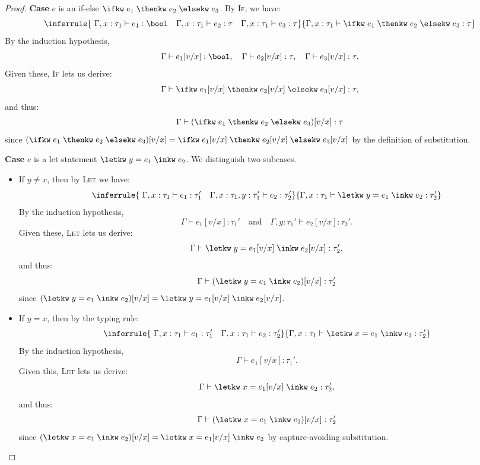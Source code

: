 \begin{proof}
	\textbf{Case} $e$ is an if-else $\ifkw \; e_1 \; \thenkw \; e_2 \; \elsekw \; e_3$. By \textsc{If}, we have:
	\[
		\inferrule
		{\ \Gamma, x : \tau_1 \vdash e_1 : \bool \quad \Gamma, x : \tau_1 \vdash e_2 : \tau \quad \Gamma, x : \tau_1 \vdash e_3 : \tau}
		{\Gamma, x : \tau_1 \vdash \ifkw \; e_1 \; \thenkw \; e_2 \; \elsekw \; e_3 : \tau}
	\]
	By the induction hypothesis,
	\[
		\Gamma \vdash e_1[v/x] : \bool,
		\quad
		\Gamma \vdash e_2[v/x] : \tau,
		\quad
		\Gamma \vdash e_3[v/x] : \tau.
	\]
	Given these, \textsc{If} lets us derive:
	\[
		\Gamma \vdash \ifkw \; e_1[v/x] \; \thenkw \; e_2[v/x] \; \elsekw \; e_3[v/x] : \tau,
	\]
	and thus:
	\[
		\Gamma \vdash (\ifkw \; e_1 \; \thenkw \; e_2 \; \elsekw \; e_3)[v/x] : \tau
	\]
	since $(\ifkw \; e_1 \; \thenkw \; e_2 \; \elsekw \; e_3)[v/x] = \ifkw \; e_1[v/x] \; \thenkw \; e_2[v/x] \; \elsekw \; e_3[v/x]$ by the definition of substitution.

	\textbf{Case} $e$ is a let statement $\letkw \; y = e_1 \; \inkw \; e_2$. We distinguish two subcases.

	\begin{itemize}
		\item If $y \neq x$, then by \textsc{Let} we have:
		\[
			\inferrule
			{\ \Gamma, x : \tau_1 \vdash e_1 : \tau_1' \quad \Gamma, x : \tau_1, y : \tau_1' \vdash e_2 : \tau_2'}
			{\Gamma, x : \tau_1 \vdash \letkw \; y = e_1 \; \inkw \; e_2 : \tau_2'}
		\]
		By the induction hypothesis,
		\[
			\Gamma \vdash e_1[v/x] : \tau_1'
			\quad\text{and}\quad
			\Gamma, y : \tau_1' \vdash e_2[v/x] : \tau_2'.
		\]
		Given these, \textsc{Let} lets us derive:
		\[
			\Gamma \vdash \letkw \; y = e_1[v/x] \; \inkw \; e_2[v/x] : \tau_2',
		\]
		and thus:
		\[
			\Gamma \vdash (\letkw \; y = e_1 \; \inkw \; e_2)[v/x] : \tau_2'
		\]
		since $(\letkw \; y = e_1 \; \inkw \; e_2)[v/x] = \letkw \; y = e_1[v/x] \; \inkw \; e_2[v/x]$.

		\item If $y = x$, then by the typing rule:
		\[
			\inferrule
			{\ \Gamma, x : \tau_1 \vdash e_1 : \tau_1' \quad \Gamma, x : \tau_1 \vdash e_2 : \tau_2'}
			{\Gamma, x : \tau_1 \vdash \letkw \; x = e_1 \; \inkw \; e_2 : \tau_2'}
		\]
		By the induction hypothesis,
		\[
			\Gamma \vdash e_1[v/x] : \tau_1'.
		\]
		Given this, \textsc{Let} lets us derive:
		\[
			\Gamma \vdash \letkw \; x = e_1[v/x] \; \inkw \; e_2 : \tau_2',
		\]
		and thus:
		\[
			\Gamma \vdash (\letkw \; x = e_1 \; \inkw \; e_2)[v/x] : \tau_2'
		\]
		since $(\letkw \; x = e_1 \; \inkw \; e_2)[v/x] = \letkw \; x = e_1[v/x] \; \inkw \; e_2$ by capture-avoiding substitution.
	\end{itemize}


\end{proof}
